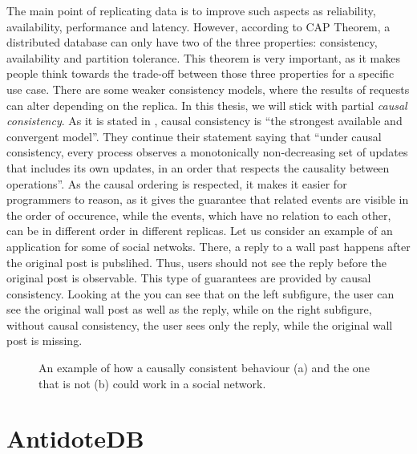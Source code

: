 The main point of replicating data is to improve such aspects as reliability, availability, performance and latency. However, according to CAP Theorem\cite{29}, a distributed database can only have two of the three properties: consistency, availability and partition tolerance. This theorem is very important, as it makes people think towards the trade-off between those three properties for a specific use case. There are some weaker consistency models, where the results of requests can alter depending on the replica\cite{28}.  In this thesis, we will stick with partial \textit{causal consistency}. As it is stated in \citet{7}, causal consistency is ``the strongest available and convergent model''. They continue their statement saying that ``under causal consistency, every process observes a monotonically non-decreasing set of updates that includes its own updates, in an order that respects the causality between operations''. As the causal ordering is respected, it makes it easier for programmers to reason, as it gives the guarantee that related events are visible in the order of occurence, while the events, which have no relation to each other, can be in different order in different replicas. Let us consider an example of an application for some of social netwoks. There, a reply to a wall past happens after the original post is pubslihed. Thus, users should not see the reply before the original post is observable. This type of guarantees are provided by causal consistency. Looking at the  you can see that on the left subfigure, the user can see the original wall post as well as the reply, while on the right subfigure, without causal consistency, the user sees only the reply, while the original wall post is missing. 

\begin{figure}%
    \centering
    \def\svgwidth{0.4\linewidth}
    \subfloat[]{{}}%
    \qquad
    \def\svgwidth{0.4\linewidth}
    \subfloat[]{{}}%
    \caption{An example of how a causally consistent behaviour (a) and the one that is not (b) could work in a social network.}%
    \label{fig:theory3}%
\end{figure}





\section{AntidoteDB}


